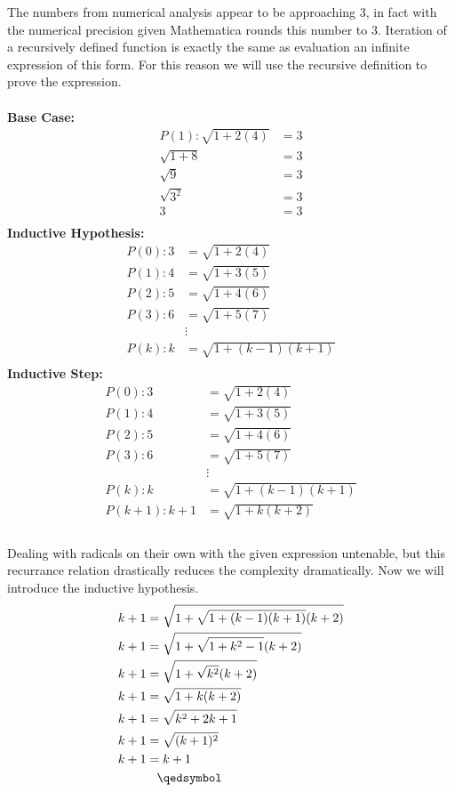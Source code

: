 \documentclass[12pt]{article}
\begin{document}
The numbers from numerical analysis appear to be approaching 3, in fact with the numerical precision given Mathematica rounds this number to 3. Iteration of a recursively defined function is exactly the same as evaluation an infinite expression of this form. For this reason we will use the recursive definition to prove the expression. \\\\
\textbf{Base Case:}\\
\begin{align*}
P(1):\sqrt{1+2(4)} &= 3\\
\sqrt{1+8} &= 3\\
\sqrt{9} &= 3\\
\sqrt{3^2} &= 3\\
3 &= 3\\
\end{align*}
\textbf{Inductive Hypothesis:}\\
\begin{align*}
P(0):3 &= \sqrt{1+2(4)}\\
P(1):4 &= \sqrt{1+3(5)}\\
P(2):5 &= \sqrt{1+4(6)}\\
P(3):6 &= \sqrt{1+5(7)}\\
&\vdots\\
P(k):k &= \sqrt{1+(k-1)(k+1)}\\
\end{align*}
\textbf{Inductive Step:}\\
\begin{align*}
P(0):3 &= \sqrt{1+2(4)}\\
P(1):4 &= \sqrt{1+3(5)}\\
P(2):5 &= \sqrt{1+4(6)}\\
P(3):6 &= \sqrt{1+5(7)}\\
&\vdots\\
P(k):k &= \sqrt{1+(k-1)(k+1)}\\
P(k + 1):k + 1 &= \sqrt{1+k(k+2)}\\
\end{align*}\\
Dealing with radicals on their own with the given expression untenable, but this recurrance relation drastically reduces the complexity dramatically. Now we will introduce the inductive hypothesis.\\
\begin{align*}
k + 1 &= \sqrt{1+\sqrt{1+(k-1)(k+1)}(k+2)}\\
k + 1 &= \sqrt{1+\sqrt{1+k^2-1}(k+2)}\\
k + 1 &= \sqrt{1+\sqrt{k^2}(k+2)}\\
k + 1 &= \sqrt{1+k(k+2)}\\
k + 1 &= \sqrt{k^2+2k+1}\\
k + 1 &= \sqrt{(k+1)^2}\\
k + 1 &= k+1\\
&\hspace{0.3cm}\qedsymbol
\end{align*}
\end{document}
